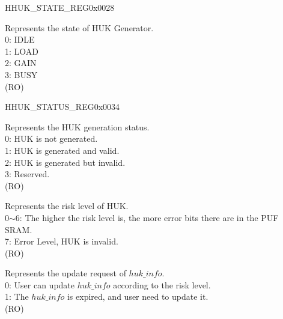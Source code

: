 \begin{register}{H}{HUK\_STATE\_REG}{0x0028}\label{regdesc:HUKSTATEREG}
%
%
\regnewline%
\begin{regdesc}\begin{reglist}
\label{fielddesc:HUKSTATE}\item [HUK\_STATE] Represents the state of HUK Generator. \\
0: IDLE \\
1: LOAD \\
2: GAIN\\
3: BUSY\\
(RO)
\end{reglist}\end{regdesc}
\end{register}


\begin{register}{H}{HUK\_STATUS\_REG}{0x0034}\label{regdesc:HUKSTATUSREG}
%
%
%
%
\regnewline%
\begin{regdesc}\begin{reglist}
\label{fielddesc:HUKSTATUS}\item [HUK\_STATUS] Represents the HUK generation status. \\
0: HUK is not generated.\\
1: HUK is generated and valid.\\
2: HUK is generated but invalid.\\
3: Reserved.\\
(RO)
\label{fielddesc:HUKRISKLEVEL}\item [HUK\_RISK\_LEVEL] Represents the risk level of HUK. \\
0$\sim$6: The higher the risk level is, the more error bits there are in the PUF SRAM. \\
7: Error Level, HUK is invalid.\\
(RO)
\label{fielddesc:HUKUPDATEREQ}\item [HUK\_UPDATE\_REQ] Represents the update request of \begin{math}huk\_info\end{math}.\\
0:  User can update \begin{math}huk\_info\end{math} according to the risk level.\\
1: The \begin{math}huk\_info\end{math} is expired, and user need to update it. \\
(RO)
\end{reglist}\end{regdesc}
\end{register}


